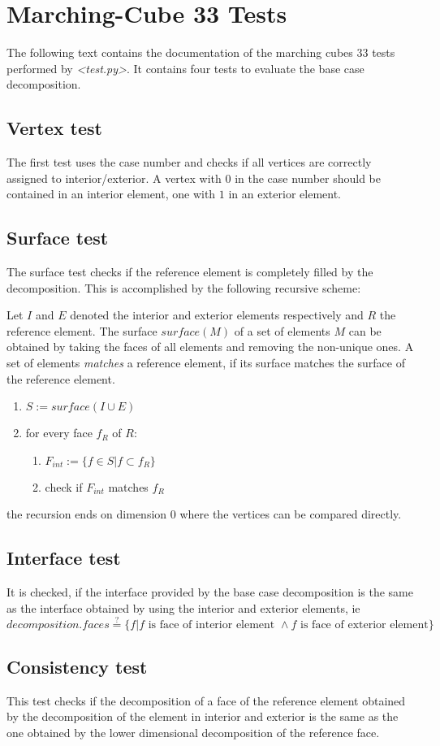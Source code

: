 \documentclass[a4paper, 11pt]{scrartcl}
\newcommand{\file}[1]{\emph{\textless #1\textgreater}}
\begin{document}
\section*{Marching-Cube 33 Tests}

The following text contains the documentation of the marching cubes 33 tests performed by \file{test.py}. It contains four tests to evaluate the base case decomposition.
\subsection*{Vertex test}
The first test uses the case number and checks if all vertices are correctly assigned to interior/exterior. A vertex with $0$ in the case number should be contained in an interior element, one with $1$ in an exterior element.
\subsection*{Surface test}
The surface test checks if the reference element is completely filled by the decomposition. This is accomplished by the following recursive scheme:

Let $I$ and $E$ denoted the interior and exterior elements respectively and $R$ the reference element. The surface $surface(M)$ of a set of elements $M$ can be obtained by taking the faces of all elements and removing the non-unique ones. A set of elements \emph{matches} a reference element, if its surface matches the surface of the reference element.
\begin{enumerate}
\item $S:=surface(I\cup E)$
\item for every face $f_R$ of $R$:
  \begin{enumerate}
  \item $F_{int}:=\lbrace f \in S | f\subset f_R\rbrace$
  \item check if $F_{int}$ matches $f_R$
  \end{enumerate}
\end{enumerate}
the recursion ends on dimension $0$ where the vertices can be compared directly.
\subsection*{Interface test}
It is checked, if the interface provided by the base case decomposition is the same as the interface obtained by using the interior and exterior elements, ie \\
$decomposition.faces \stackrel{?}{=} \lbrace f | f\text{ is face of interior element }\wedge f\text{ is face of exterior element}\rbrace$
\subsection*{Consistency test}
This test checks if the decomposition of a face of the reference element obtained by the decomposition of the element in interior and exterior is the same as the one obtained by the lower dimensional decomposition of the reference face.
\end{document}
